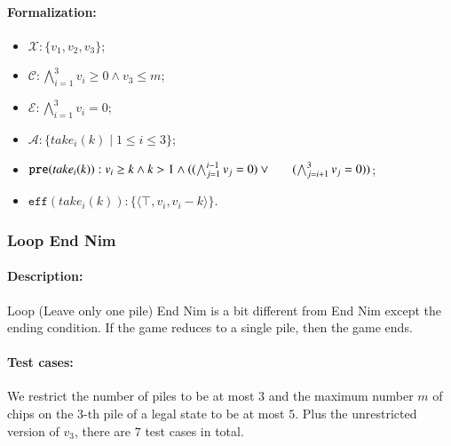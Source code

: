 \documentclass[review]{elsarticle}
\newcommand{\set}[1]{\{ #1 \}}
\newcommand{\tuple}[1]{\langle {#1} \rangle}
\newcommand{\true}{\top}
\newcommand{\statevar}{\mathcal{X}}
\newcommand{\act}{\mathcal{A}}
\newcommand{\constraint}{\mathcal{C}}
\newcommand{\estate}{\mathcal{E}}
\newcommand{\pre}{\mathtt{pre}}
\newcommand{\eff}{\mathtt{eff}}
\begin{document}
\paragraph{Formalization:}
\begin{itemize}
	\item $\statevar: \set{v_1, v_2 ,v_3}$;
	\item $\constraint:\bigwedge_{i=1}^{3} v_i \ge 0 \wedge v_3 \le m$;
	\item $\estate: \bigwedge_{i=1}^{3} v_i = 0$;
	\item $\act:\set{take_i(k) {\mid} 1 \le i \le 3}$;
	\item $\pre(take_i(k)) : v_i \ge k \wedge k > 1 \wedge ((\bigwedge_{j=1}^{i-1}v_j = 0 )\vee \\ \hspace*{6mm}
	(\bigwedge_{j=i+1}^{3}v_j = 0))$;
	\item $\eff(take_i(k)) : \set{\tuple{\true,v_i,v_i -k}}$.
\end{itemize}

\subsubsection{Loop End Nim \protect\cite{AlbN2001}}

\paragraph{Description:} 
Loop (Leave only one pile) End Nim is a bit different from End Nim except the ending condition. 
If the game reduces to a single pile, then the game ends. 
\paragraph{Test cases:}
We restrict the number of piles to be at most $3$ and the maximum number $m$ of chips on the $3$-th pile of a legal state to be at most $5$.
Plus the unrestricted version of $v_3$, there are $7$ test cases in total.
\end{document}
